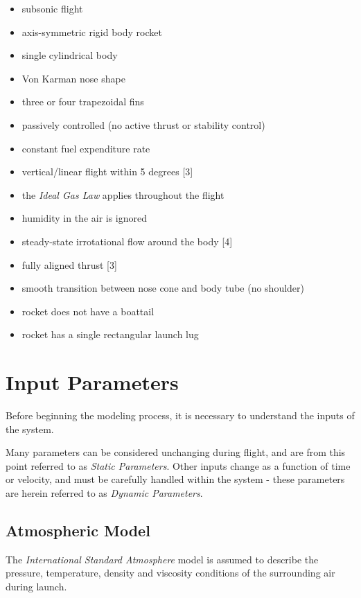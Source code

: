 \documentclass[]{article}
\providecommand{\tightlist}{%
  \setlength{\itemsep}{0pt}\setlength{\parskip}{0pt}}
\begin{document}
\begin{itemize}
\tightlist
\item
  subsonic flight
\item
  axis-symmetric rigid body rocket
\item
  single cylindrical body
\item
  Von Karman nose shape
\item
  three or four trapezoidal fins
\item
  passively controlled (no active thrust or stability control)
\item
  constant fuel expenditure rate
\item
  vertical/linear flight within 5 degrees {[}3{]}
\item
  the \emph{Ideal Gas Law} applies throughout the flight
\item
  humidity in the air is ignored
\item
  steady-state irrotational flow around the body {[}4{]}
\item
  fully aligned thrust {[}3{]}
\item
  smooth transition between nose cone and body tube (no shoulder)
\item
  rocket does not have a boattail
\item
  rocket has a single rectangular launch lug
\end{itemize}

\section{Input Parameters}\label{input-parameters}

Before beginning the modeling process, it is necessary to understand the
inputs of the system.

Many parameters can be considered unchanging during flight, and are from
this point referred to as \emph{Static Parameters}. Other inputs change
as a function of time or velocity, and must be carefully handled within
the system - these parameters are herein referred to as \emph{Dynamic
Parameters}.

\subsection{Atmospheric Model}\label{atmospheric-model}

The \emph{International Standard Atmosphere} model is assumed to
describe the pressure, temperature, density and viscosity conditions of
the surrounding air during launch.
\end{document}
